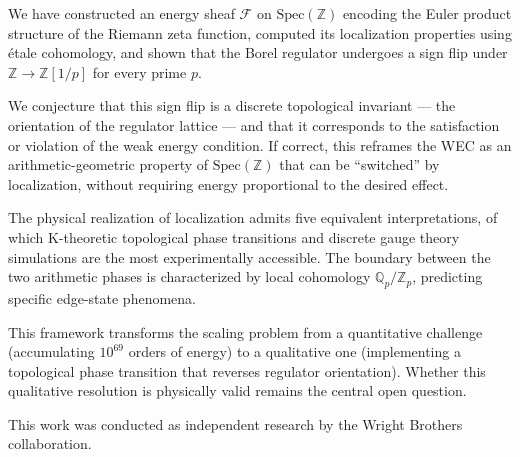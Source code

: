 \documentclass[aps,prd,twocolumn,superscriptaddress,nofootinbib]{revtex4-2}
\newcommand{\Spec}{\mathrm{Spec}}
\newcommand{\Zp}{\mathbb{Z}[1/p]}
\newcommand{\Qp}{\mathbb{Q}_p}
\begin{document}
We have constructed an energy sheaf $\mathcal{F}$ on $\Spec(\mathbb{Z})$
encoding the Euler product structure of the Riemann zeta function,
computed its localization properties using \'etale cohomology,
and shown that the Borel regulator undergoes a sign flip under
$\mathbb{Z} \to \Zp$ for every prime $p$.

We conjecture that this sign flip is a discrete topological
invariant --- the orientation of the regulator lattice ---
and that it corresponds to the satisfaction or violation of the
weak energy condition. If correct, this reframes the WEC as an
arithmetic-geometric property of $\Spec(\mathbb{Z})$ that can be
``switched'' by localization, without requiring energy proportional
to the desired effect.

The physical realization of localization admits five equivalent
interpretations, of which K-theoretic topological phase transitions
and discrete gauge theory simulations are the most experimentally
accessible. The boundary between the two arithmetic phases is
characterized by local cohomology $\Qp/\mathbb{Z}_p$, predicting
specific edge-state phenomena.

This framework transforms the scaling problem from a quantitative
challenge (accumulating $10^{69}$ orders of energy) to a qualitative
one (implementing a topological phase transition that reverses
regulator orientation). Whether this qualitative resolution is
physically valid remains the central open question.

\begin{acknowledgments}
This work was conducted as independent research by the
Wright Brothers collaboration.
\end{acknowledgments}
\end{document}
